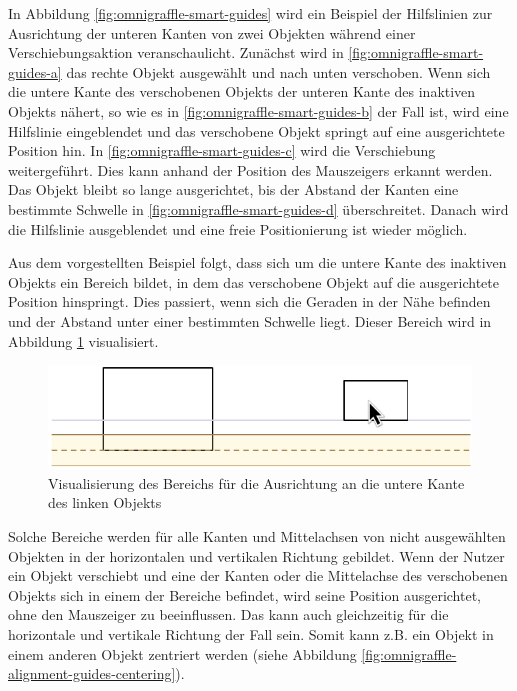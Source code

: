 In Abbildung \ref{fig:omnigraffle-smart-guides} wird ein Beispiel der Hilfslinien zur Ausrichtung der unteren Kanten von zwei Objekten während einer Verschiebungsaktion veranschaulicht. Zunächst wird in \ref{fig:omnigraffle-smart-guides-a} das rechte Objekt ausgewählt und nach unten verschoben. Wenn sich die untere Kante des verschobenen Objekts der unteren Kante des inaktiven Objekts nähert, so wie es in \ref{fig:omnigraffle-smart-guides-b} der Fall ist, wird eine Hilfslinie eingeblendet und das verschobene Objekt springt auf eine ausgerichtete Position hin. In \ref{fig:omnigraffle-smart-guides-c} wird die Verschiebung weitergeführt. Dies kann anhand der Position des Mauszeigers erkannt werden. Das Objekt bleibt so lange ausgerichtet, bis der Abstand der Kanten eine bestimmte Schwelle in \ref{fig:omnigraffle-smart-guides-d} überschreitet. Danach wird die Hilfslinie ausgeblendet und eine freie Positionierung ist wieder möglich.

Aus dem vorgestellten Beispiel folgt, dass sich um die untere Kante des inaktiven Objekts ein Bereich bildet, in dem das verschobene Objekt auf die ausgerichtete Position hinspringt. Dies passiert, wenn sich die Geraden in der Nähe befinden und der Abstand unter einer bestimmten Schwelle liegt. Dieser Bereich wird in Abbildung \ref{fig:omnigraffle-smart-guides-snap-area} visualisiert.

\begin{figure}[hbt]
    \centering
    \includegraphics{assets/omnigraffle-smart-guides-snap-area}
    \caption{Visualisierung des Bereichs für die Ausrichtung an die untere Kante des linken Objekts}
    \label{fig:omnigraffle-smart-guides-snap-area}
\end{figure}

Solche Bereiche werden für alle Kanten und Mittelachsen von nicht ausgewählten Objekten in der horizontalen und vertikalen Richtung gebildet. Wenn der Nutzer ein Objekt verschiebt und eine der Kanten oder die Mittelachse des verschobenen Objekts sich in einem der Bereiche befindet, wird seine Position ausgerichtet, ohne den Mauszeiger zu beeinflussen. Das kann auch gleichzeitig für die horizontale und vertikale Richtung der Fall sein. Somit kann z.B. ein Objekt in einem anderen Objekt zentriert werden (siehe Abbildung \ref{fig:omnigraffle-alignment-guides-centering}).

